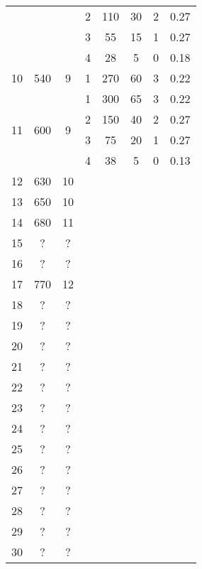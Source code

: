 \begin{longtable}[c]{|c|c|c|c|c|c|c|c|}
    & & & 2 & 110 & 30 & 2 & 0.27 \\\cline{4-8}
    & & & 3 & 55 & 15 & 1 & 0.27 \\\cline{4-8}
    & & & 4 & 28 & 5 & 0 & 0.18 \\\hline
    \multirow{1}{*}{10} & \multirow{1}{*}{540} & \multirow{1}{*}{9} & 1 & 270 & 60 & 3 & 0.22 \\\hline
    \multirow{4}{*}{11} & \multirow{4}{*}{600} & \multirow{4}{*}{9} & 1 & 300 & 65 & 3 & 0.22 \\\cline{4-8}
    & & & 2 & 150 & 40 & 2 & 0.27 \\\cline{4-8}
    & & & 3 & 75 & 20 & 1 & 0.27 \\\cline{4-8}
    & & & 4 & 38 & 5 & 0 & 0.13 \\\hline
    \multirow{1}{*}{12} & \multirow{1}{*}{630} & \multirow{1}{*}{10} & & & & & \\\hline
    \multirow{1}{*}{13} & \multirow{1}{*}{650} & \multirow{1}{*}{10} & & & & & \\\hline
    \multirow{1}{*}{14} & \multirow{1}{*}{680} & \multirow{1}{*}{11} & & & & & \\\hline
    \multirow{1}{*}{15} & \multirow{1}{*}{?} & \multirow{1}{*}{?} & & & & & \\\hline
    \multirow{1}{*}{16} & \multirow{1}{*}{?} & \multirow{1}{*}{?} & & & & & \\\hline
    \multirow{1}{*}{17} & \multirow{1}{*}{770} & \multirow{1}{*}{12} & & & & & \\\hline
    \multirow{1}{*}{18} & \multirow{1}{*}{?} & \multirow{1}{*}{?} & & & & & \\\hline
    \multirow{1}{*}{19} & \multirow{1}{*}{?} & \multirow{1}{*}{?} & & & & & \\\hline
    \multirow{1}{*}{20} & \multirow{1}{*}{?} & \multirow{1}{*}{?} & & & & & \\\hline
    \multirow{1}{*}{21} & \multirow{1}{*}{?} & \multirow{1}{*}{?} & & & & & \\\hline
    \multirow{1}{*}{22} & \multirow{1}{*}{?} & \multirow{1}{*}{?} & & & & & \\\hline
    \multirow{1}{*}{23} & \multirow{1}{*}{?} & \multirow{1}{*}{?} & & & & & \\\hline
    \multirow{1}{*}{24} & \multirow{1}{*}{?} & \multirow{1}{*}{?} & & & & & \\\hline
    \multirow{1}{*}{25} & \multirow{1}{*}{?} & \multirow{1}{*}{?} & & & & & \\\hline
    \multirow{1}{*}{26} & \multirow{1}{*}{?} & \multirow{1}{*}{?} & & & & & \\\hline
    \multirow{1}{*}{27} & \multirow{1}{*}{?} & \multirow{1}{*}{?} & & & & & \\\hline
    \multirow{1}{*}{28} & \multirow{1}{*}{?} & \multirow{1}{*}{?} & & & & & \\\hline
    \multirow{1}{*}{29} & \multirow{1}{*}{?} & \multirow{1}{*}{?} & & & & & \\\hline
    \multirow{1}{*}{30} & \multirow{1}{*}{?} & \multirow{1}{*}{?} & & & & & \\\hline
\end{longtable}


